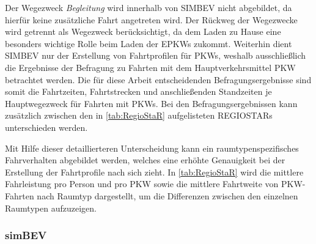

Der Wegezweck \textit{Begleitung} wird innerhalb von \gls{SIMBEV} nicht abgebildet, da hierfür keine zusätzliche Fahrt angetreten wird.
Der Rückweg der Wegezwecke wird getrennt als Wegezweck \nH berücksichtigt, da dem Laden zu Hause eine besonders wichtige Rolle beim Laden der \glspl{EPKW} zukommt.
Weiterhin dient \gls{SIMBEV} nur der Erstellung von Fahrtprofilen für \glspl{PKW}, weshalb ausschließlich die Ergebnisse der Befragung zu Fahrten mit dem Hauptverkehrsmittel \gls{PKW} betrachtet werden.
Die für diese Arbeit entscheidenden Befragungsergebnisse sind somit die Fahrtzeiten, Fahrtstrecken und anschließenden Standzeiten je Hauptwegezweck für Fahrten mit \glspl{PKW}.
Bei den Befragungsergebnissen kann zusätzlich zwischen den in \autoref{tab:RegioStaR} aufgelisteten \glspl{REGIOSTAR} unterschieden werden.



Mit Hilfe dieser detaillierteren Unterscheidung kann ein raumtypenspezifisches Fahrverhalten abgebildet werden, welches eine erhöhte Genauigkeit bei der Erstellung der Fahrtprofile nach sich zieht.
In \autoref{tab:RegioStaR} wird die mittlere Fahrleistung pro Person und pro \gls{PKW} sowie die mittlere Fahrtweite von \gls{PKW}-Fahrten nach Raumtyp dargestellt, um die Differenzen zwischen den einzelnen Raumtypen aufzuzeigen.




\subsubsection{simBEV}

